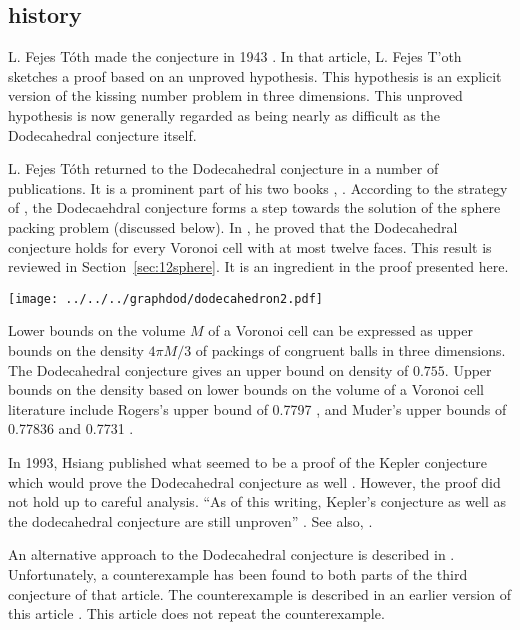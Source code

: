 \subsection{history}


L. Fejes T\'oth made the conjecture in 1943 \cite{Toth1}.  
In that article, L. Fejes
T'oth sketches a proof based on an unproved hypothesis.  This
hypothesis is an explicit version of the kissing number problem
in three dimensions.   This unproved hypothesis
is now generally regarded as being 
nearly as difficult as the  Dodecahedral conjecture itself.  

L. Fejes T\'oth returned to the Dodecahedral conjecture in a number
of publications.  It is a prominent part of his two books \cite{Fej72},
\cite{Toth2}.  According to the strategy of \cite{Fej72}, 
the Dodecaehdral conjecture forms a
step towards the solution of the sphere packing problem
(discussed below).   In \cite{Toth2}, he proved that the Dodecahedral conjecture
holds for every Voronoi cell with at most twelve faces.  
This result is reviewed in Section~\ref{sec:12sphere}.  It
is an ingredient in the proof presented here. 

\begin{floatingfigure}{30mm}
  \begin{center}
  \texttt{[image: ../../../graphdod/dodecahedron2.pdf]}
   \end{center}
  \caption{}
\label{fig:dod}
\end{floatingfigure}

Lower bounds on the volume $M$ of a Voronoi cell can be expressed
as upper bounds on the density $4\pi M/3$ of packings of congruent balls
in three dimensions. The Dodecahedral conjecture gives an upper
bound on density of $0.755$.  
Upper bounds on the density based on lower bounds on the volume of a Voronoi cell
literature include Rogers's upper bound of 0.7797 \cite{Rogers}, and Muder's upper 
bounds of 0.77836 \cite{Muder1} and 0.7731 \cite{Muder2}. 

In 1993, Hsiang published what seemed to be a proof of the Kepler
conjecture which would prove the Dodecahedral conjecture 
as well \cite{Hsiang}.
However, the proof did not hold up to careful analysis.  ``As of this
writing, Kepler's conjecture as well as the dodecahedral conjecture
are still unproven'' \cite[p761]{Bezdek}.  See also, \cite{Hal94}.

An alternative approach to the Dodecahedral conjecture is described
in \cite{Bezdek}.  Unfortunately, a counterexample has been found to
both parts of the third conjecture of that article.  The counterexample
is described in an earlier version of this article \cite{arx}.  This
article
does not repeat the counterexample.


